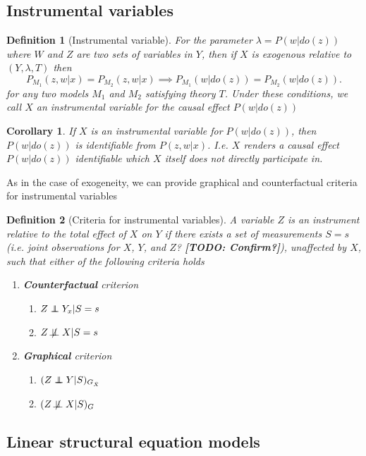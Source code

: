 \documentclass[11pt]{article}
\numberwithin{equation}{section}
\newcommand\indep{\protect\mathpalette{\protect\independenT}{\perp}}
\newcommand{\nindep}{\not\!\perp\!\!\!\perp}
\def\independenT#1#2{\mathrel{\rlap{$#1#2$}\mkern2mu{#1#2}}}
\newtheorem{defn}{Definition}[section]
\newtheorem{cor}{Corollary}[section]
\begin{document}
\subsection{Instrumental variables}
\begin{defn}[Instrumental variable]
For the parameter $\lambda = P(w|do(z))$ where $W$ and $Z$ are two sets of variables in $Y$, then if $X$ is exogenous relative to $(Y, \lambda, T)$ then
\begin{equation}
P_{M_1}(z,w|x) = P_{M_2}(z,w|x) \implies P_{M_1}(w|do(z)) = P_{M_2}(w|do(z)).
\end{equation}
for any two models $M_1$ and $M_2$ satisfying theory $T$. Under these conditions, we call $X$ an instrumental variable for the causal effect $P(w|do(z))$
\end{defn}

\begin{cor}
If $X$ is an instrumental variable for $P(w|do(z))$, then $P(w|do(z))$ is identifiable from $P(z,w|x)$. I.e. $X$ renders a causal effect $P(w|do(z))$ identifiable which $X$ itself does not directly participate in.
\end{cor}

As in the case of exogeneity, we can provide graphical and counterfactual criteria for instrumental variables
\begin{defn}[Criteria for instrumental variables]
A variable $Z$ is an instrument relative to the total effect of $X$ on $Y$ if there exists a set of measurements $S=s$ (i.e. joint observations for $X$, $Y$, and $Z$? \textbf{[TODO: Confirm?]}), unaffected by $X$, such that either of the following criteria holds
\begin{enumerate}
\item \textbf{Counterfactual} criterion
\begin{enumerate}
\item $Z \indep Y_x | S=s$
\item $Z \nindep X|S=s$
\end{enumerate}
\item \textbf{Graphical} criterion
\begin{enumerate}
\item $(Z \indep Y|S)_{G_{\bar{X}}}$
\item $(Z \nindep X|S)_G$
\end{enumerate}
\end{enumerate} 
\end{defn}


\subsection{Linear structural equation models}
\end{document}
